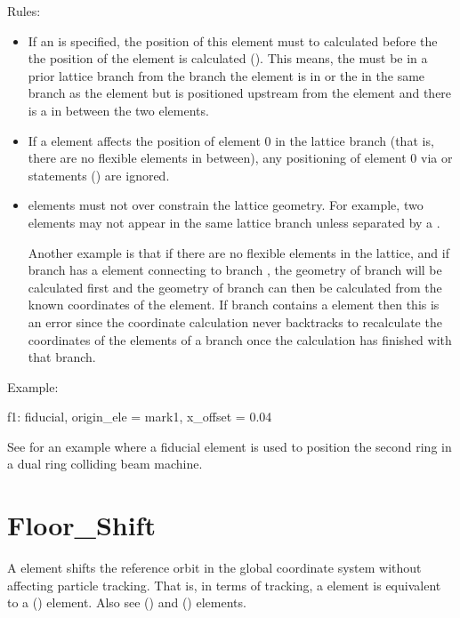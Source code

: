 Rules: 
  \begin{itemize}
  \item
If an  is specified, the position of this element must
to calculated before the the position of the  element is
calculated (). This means, the  must be in
a prior lattice branch from the branch the  element is in
or the  in the same branch as the  element
but is positioned upstream from the  element and there is
a   in between the two elements.
  \item
If a  element affects the position of element 0 in the
lattice branch (that is, there are no flexible  elements
in between), any positioning of element 0 via  or
 statements () are ignored.
  \item
{} elements must not over constrain the lattice geometry.
For example, two  elements may not appear in the same
lattice branch unless separated by a  . 

Another example is that if there are no flexible  elements
in the lattice, and if branch  has a  element
connecting to branch , the geometry of branch  will be
calculated first and the geometry of branch  can then be
calculated from the known coordinates of the  element. If
branch  contains a  element then this is an error
since the coordinate calculation never backtracks to recalculate the
coordinates of the elements of a branch once the calculation has
finished with that branch.
  \end{itemize}

Example:
\begin{example}
  f1: fiducial, origin_ele = mark1, x_offset = 0.04
\end{example}
See  for an example where a fiducial element is
used to position the second ring in a dual ring colliding beam 
machine.

\section{Floor_Shift}
\label{s:floor.ele}

A  element shifts the reference orbit in the global
coordinate system without affecting particle tracking. That is, in
terms of tracking, a  element is equivalent to a
 () element. Also see 
() and  () elements.

